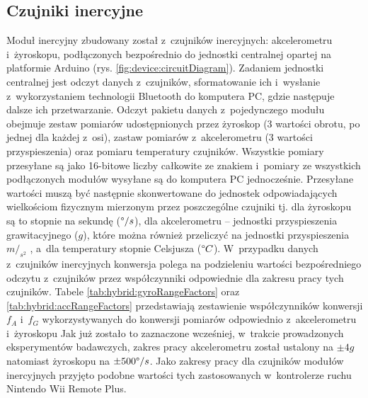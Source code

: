 \subsection{Czujniki inercyjne}
Moduł inercyjny zbudowany został z~czujników inercyjnych: akcelerometru i~żyroskopu, podłączonych bezpośrednio do jednostki centralnej opartej na platformie Arduino (rys. \ref{fig:device:circuitDiagram}). Zadaniem jednostki centralnej jest odczyt danych z~czujników, sformatowanie ich i~wysłanie z~wykorzystaniem technologii Bluetooth do komputera PC, gdzie następuje dalsze ich przetwarzanie. Odczyt pakietu danych z~pojedynczego modułu obejmuje zestaw pomiarów udostępnionych przez żyroskop (3 wartości obrotu, po jednej dla każdej z~osi), zastaw pomiarów z~akcelerometru (3 wartości przyspieszenia) oraz pomiaru temperatury czujników. Wszystkie pomiary przesyłane są jako 16-bitowe liczby całkowite ze znakiem i~pomiary ze wszystkich podłączonych modułów wysyłane są do komputera PC jednocześnie. Przesyłane wartości muszą być następnie skonwertowane do jednostek odpowiadających wielkościom fizycznym mierzonym przez poszczególne czujniki tj. dla żyroskopu są to stopnie na sekundę ($\degree/s$), dla akcelerometru -- jednostki przyspieszenia grawitacyjnego ($g$), które można również przeliczyć na jednostki przyspieszenia $m/_{s^2}$
, a~dla temperatury stopnie Celsjusza ($\degree C$). W~przypadku danych z~czujników inercyjnych konwersja polega na podzieleniu wartości bezpośredniego odczytu z~czujników przez współczynniki odpowiednie dla zakresu pracy tych czujników. Tabele \ref{tab:hybrid:gyroRangeFactors} oraz \ref{tab:hybrid:accRangeFactors} przedstawiają zestawienie współczynników konwersji $f_A$ i~$f_G$ wykorzystywanych do konwersji pomiarów odpowiednio z~akcelerometru i~żyroskopu 
Jak już zostało to zaznaczone wcześniej, w~trakcie prowadzonych eksperymentów badawczych, zakres pracy akcelerometru został ustalony na $\pm4g$ natomiast żyroskopu na $\pm500\degree/s$. Jako zakresy pracy dla czujników modułów inercyjnych przyjęto podobne wartości tych zastosowanych w~kontrolerze ruchu Nintendo Wii Remote Plus. 

